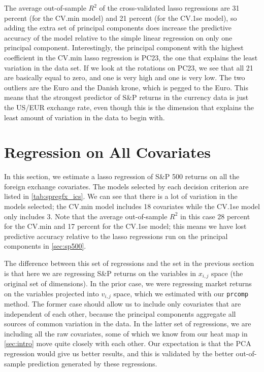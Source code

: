 \documentclass[11pt, fleqn]{article}
\begin{document}


The average out-of-sample $R^2$ of the cross-validated lasso regressions are 31 percent (for the CV.min model) and 21 percent (for the CV.1se model), so adding the extra set of principal components does increase the predictive accuracy of the model relative to the simple linear regression on only one principal component. Interestingly, the principal component with the highest coefficient in the CV.min lasso regression is PC23, the one that explains the least variation in the data set. If we look at the rotations on PC23, we see that all 21 are basically equal to zero, and one is very high and one is very low. The two outliers are the Euro and the Danish krone, which is pegged to the Euro. This means that the strongest predictor of S\&P returns in the currency data is just the US/EUR exchange rate, even though this is the dimension that explains the least amount of variation in the data to begin with.

\section{Regression on All Covariates} \label{sec:regall}

In this section, we estimate a lasso regression of S\&P 500 returns on all the foreign exchange covariates. The models selected by each decision criterion are listed in \cref{tab:spregfx_ics}. We can see that there is a lot of variation in the models selected; the CV.min model includes 18 covariates while the CV.1se model only includes 3. Note that the average out-of-sample $R^2$ in this case 28 percent for the CV.min and 17 percent for the CV.1se model; this means we have lost predictive accuracy relative to the lasso regressions run on the principal components in \cref{sec:sp500}. 

The difference between this set of regressions and the set in the previous section is that here we are regressing S\&P returns on the variables in $x_{i,j}$ space (the original set of dimensions). In the prior case, we were regressing market returns on the variables projected into $v_{i,j}$ space, which we estimated with our \texttt{prcomp} method. The former case should allow us to include only covariates that are independent of each other, because the principal components aggregate all sources of common variation in the data. In the latter set of regressions, we are including all the raw covariates, some of which we know from our heat map in \cref{sec:intro} move quite closely with each other. Our expectation is that the PCA regression would give us better results, and this is validated by the better out-of-sample prediction generated by these regressions.
\end{document}
